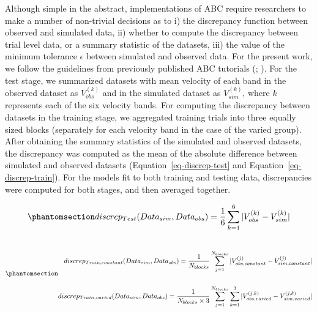 \documentclass[
  11pt,
  letterpaper,
]{article}
\begin{document}
\begin{tcolorbox}[enhanced jigsaw, opacityback=0, left=2mm, colframe=quarto-callout-color-frame, toprule=.15mm, rightrule=.15mm, leftrule=.75mm, bottomrule=.15mm, arc=.35mm, breakable, colback=white]
Although simple in the abstract, implementations of ABC require
researchers to make a number of non-trivial decisions as to i) the
discrepancy function between observed and simulated data, ii) whether to
compute the discrepancy between trial level data, or a summary statistic
of the datasets, iii) the value of the minimum tolerance \(\epsilon\)
between simulated and observed data. For the present work, we follow the
guidelines from previously published ABC tutorials
(;
). For the test stage, we summarized datasets with mean
velocity of each band in the observed dataset as \(V_{obs}^{(k)}\) and
in the simulated dataset as \(V_{sim}^{(k)}\), where \(k\) represents
each of the six velocity bands. For computing the discrepancy between
datasets in the training stage, we aggregated training trials into three
equally sized blocks (separately for each velocity band in the case of
the varied group). After obtaining the summary statistics of the
simulated and observed datasets, the discrepancy was computed as the
mean of the absolute difference between simulated and observed datasets
(Equation~\ref{eq-discrep-test} and Equation~\ref{eq-discrep-train}).
For the models fit to both training and testing data, discrepancies were
computed for both stages, and then averaged together.

\begin{equation}\phantomsection\label{eq-discrep-test}{
discrep_{Test}(Data_{sim}, Data_{obs}) = \frac{1}{6} \sum_{k=1}^{6} |V_{obs}^{(k)} - V_{sim}^{(k)}|
}\end{equation}

\begin{equation}\phantomsection\label{eq-discrep-train}{
\begin{aligned} \\
discrep_{Train,constant}(Data_{sim}, Data_{obs}) = \frac{1}{N_{blocks}} \sum_{j=1}^{N_{blocks}} |V_{obs,constant}^{(j)} - V_{sim,constant}^{(j)}| \\ \\
discrep_{Train,varied}(Data_{sim}, Data_{obs}) = \frac{1}{N_{blocks} \times 3} \sum_{j=1}^{N_{blocks}} \sum_{k=1}^{3} |V_{obs,varied}^{(j,k)} - V_{sim,varied}^{(j,k)}|
\end{aligned}
}\end{equation}


\end{tcolorbox}
\end{document}
